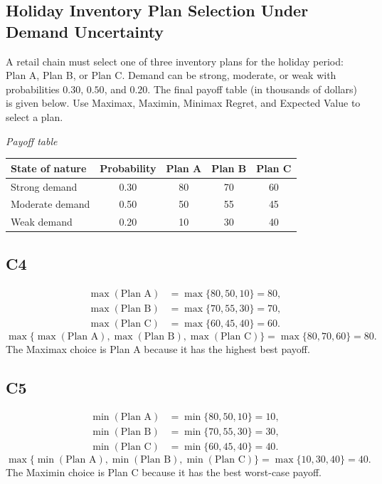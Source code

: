 \begin{ExamProblems}
		\item
		\section{Holiday Inventory Plan Selection Under Demand Uncertainty}
		A retail chain must select one of three inventory plans for the holiday period: Plan A, Plan B, or Plan C.
		Demand can be strong, moderate, or weak with probabilities $0.30$, $0.50$, and $0.20$. The final payoff table
		(in thousands of dollars) is given below. Use Maximax, Maximin, Minimax Regret, and Expected Value to select a plan.
		
		\begin{center}
			\textit{Payoff table} \\
			\begin{tabular}{l c c c c}
				\toprule
				State of nature & Probability & Plan A & Plan B & Plan C \\
				\midrule
				Strong demand & 0.30 & 80 & 70 & 60 \\
				Moderate demand & 0.50 & 50 & 55 & 45 \\
				Weak demand & 0.20 & 10 & 30 & 40 \\
				\bottomrule
			\end{tabular}
		\end{center}
		
		\subsection*{C4}
		\[
		\begin{aligned}
		\max(\text{Plan A}) &= \max\{80,50,10\} = 80,\\
		\max(\text{Plan B}) &= \max\{70,55,30\} = 70,\\
		\max(\text{Plan C}) &= \max\{60,45,40\} = 60.
		\end{aligned}
		\]
		\[
		\max\{\max(\text{Plan A}), \max(\text{Plan B}), \max(\text{Plan C})\}
		= \max\{80, 70, 60\}
		= 80.
		\]
		The Maximax choice is Plan A because it has the highest best payoff.
		
		\subsection*{C5}
		\[
		\begin{aligned}
		\min(\text{Plan A}) &= \min\{80,50,10\} = 10,\\
		\min(\text{Plan B}) &= \min\{70,55,30\} = 30,\\
		\min(\text{Plan C}) &= \min\{60,45,40\} = 40.
		\end{aligned}
		\]
		\[
		\max\{\min(\text{Plan A}), \min(\text{Plan B}), \min(\text{Plan C})\}
		= \max\{10, 30, 40\}
		= 40.
		\]
		The Maximin choice is Plan C because it has the best worst-case payoff.
		

\end{ExamProblems}
